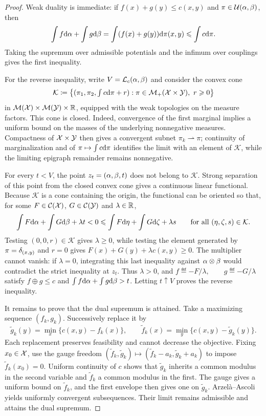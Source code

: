 \begin{proof}
	Weak duality is immediate: if $f(x)+g(y)\leq c(x,y)$ and $\pi\in\mathcal{U}(\alpha,\beta)$, then
	\[
		\int f\mathrm{d}\alpha+\int g\mathrm{d}\beta
		=
		\int (f(x)+g(y))\mathrm{d}\pi(x,y)
		\leqslant
		\int c\mathrm{d}\pi.
	\]
	Taking the supremum over admissible potentials and the infimum over couplings gives the first inequality.

	For the reverse inequality, write $V=\mathcal{L}_c(\alpha,\beta)$ and consider the convex cone
	\[
		\mathcal K
		\coloneqq
		\bigl\{(\pi_1,\pi_2,\textstyle\int c\mathrm{d}\pi+r):
		\pi\in\mathcal{M}_+(\mathcal{X}\times\mathcal{Y}),\ r\geqslant0\bigr\}
	\]
	in $\mathcal{M}(\mathcal{X})\times\mathcal{M}(\mathcal{Y})\times\mathbb{R}$, equipped with the weak topologies on the measure factors. This cone is closed. Indeed, convergence of the first marginal implies a uniform bound on the masses of the underlying nonnegative measures. Compactness of $\mathcal{X}\times\mathcal{Y}$ then gives a convergent subnet $\pi_k\rightharpoonup\pi$; continuity of marginalization and of $\pi\mapsto\int c\mathrm{d}\pi$ identifies the limit with an element of $\mathcal K$, while the limiting epigraph remainder remains nonnegative.

	For every $t<V$, the point $z_t=(\alpha,\beta,t)$ does not belong to $\mathcal K$. Strong separation of this point from the closed convex cone gives a continuous linear functional. Because $\mathcal K$ is a cone containing the origin, the functional can be oriented so that, for some $F\in\mathcal{C}(\mathcal{X})$, $G\in\mathcal{C}(\mathcal{Y})$ and $\lambda\in\mathbb{R}$,
	\[
		\int F\mathrm{d}\alpha+\int G\mathrm{d}\beta+\lambda t<0
		\leqslant
		\int F\mathrm{d}\eta+\int G\mathrm{d}\zeta+\lambda s
		\qquad
		\text{for all }(\eta,\zeta,s)\in\mathcal K.
	\]
	Testing $(0,0,r)\in\mathcal K$ gives $\lambda\geq0$, while testing the element generated by $\pi=\delta_{(x,y)}$ and $r=0$ gives
	$F(x)+G(y)+\lambda c(x,y)\geq0$. The multiplier cannot vanish: if $\lambda=0$, integrating this last inequality against $\alpha\otimes\beta$ would contradict the strict inequality at $z_t$. Thus $\lambda>0$, and
	\(f\eqdef-F/\lambda,\qquad g\eqdef-G/\lambda\)
	satisfy $f\oplus g\leq c$ and
	$\int f\mathrm{d}\alpha+\int g\mathrm{d}\beta>t$. Letting $t\uparrow V$ proves the reverse inequality.

	It remains to prove that the dual supremum is attained. Take a maximizing sequence $(f_k,g_k)$. Successively replace it by
	\[
		\widetilde g_k(y)=\min_x\{c(x,y)-f_k(x)\},
		\qquad
		\widetilde f_k(x)=\min_y\{c(x,y)-\widetilde g_k(y)\}.
	\]
	Each replacement preserves feasibility and cannot decrease the objective. Fixing $x_0\in\mathcal{X}$, use the gauge freedom
	$(\widetilde f_k,\widetilde g_k)\mapsto
	(\widetilde f_k-a_k,\widetilde g_k+a_k)$
	to impose $\widetilde f_k(x_0)=0$. Uniform continuity of $c$ shows that $\widetilde g_k$ inherits a common modulus in the second variable and $\widetilde f_k$ a common modulus in the first. The gauge gives a uniform bound on $\widetilde f_k$, and the first envelope then gives one on $\widetilde g_k$. Arzel\`a--Ascoli yields uniformly convergent subsequences. Their limit remains admissible and attains the dual supremum.
\end{proof}

